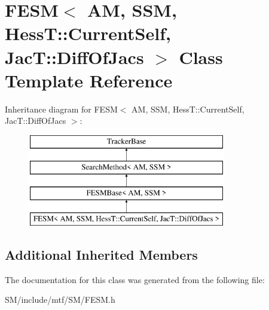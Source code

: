 \hypertarget{classFESM_3_01AM_00_01SSM_00_01HessT_1_1CurrentSelf_00_01JacT_1_1DiffOfJacs_01_4}{\section{F\-E\-S\-M$<$ A\-M, S\-S\-M, Hess\-T\-:\-:Current\-Self, Jac\-T\-:\-:Diff\-Of\-Jacs $>$ Class Template Reference}
\label{classFESM_3_01AM_00_01SSM_00_01HessT_1_1CurrentSelf_00_01JacT_1_1DiffOfJacs_01_4}
}
Inheritance diagram for F\-E\-S\-M$<$ A\-M, S\-S\-M, Hess\-T\-:\-:Current\-Self, Jac\-T\-:\-:Diff\-Of\-Jacs $>$\-:\begin{figure}[H]
\begin{center}
\leavevmode
\includegraphics[height=4.000000cm]{classFESM_3_01AM_00_01SSM_00_01HessT_1_1CurrentSelf_00_01JacT_1_1DiffOfJacs_01_4}
\end{center}
\end{figure}
\subsection*{Additional Inherited Members}


The documentation for this class was generated from the following file\-:\begin{DoxyCompactItemize}
\item 
S\-M/include/mtf/\-S\-M/F\-E\-S\-M.\-h\end{DoxyCompactItemize}
